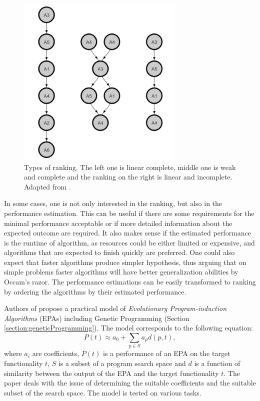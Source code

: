 \begin{figure}
	\includegraphics[width=8cm]{Images/rankingTypes.png}
	\centering
	\caption{Types of ranking. The left one is linear complete, middle one is weak and complete and the ranking on the right is linear and incomplete. Adapted from \cite{BrazdilMetalearning-2009}.}
	\label{fig:rankingTypes}	
\end{figure}

In some cases, one is not only interested in the ranking, but also in the performance estimation. This can be useful if there are some requirements for the minimal performance acceptable or if more detailed information about the expected outcome are required. It also makes sense if the estimated performance is the runtime of algorithm, as resources could be either limited or expensive, and algorithms that are expected to finish quickly are preferred. One could also expect that faster algorithms produce simpler hypothesis, thus arguing that on simple problems faster algorithms will have better generalization abilities by Occam's razor. 
The performance estimations can be easily transformed to ranking by ordering the algorithms by their estimated performance. 

Authors of \cite{evolutionaryProgramPredictingPerformance} propose a practical model of \emph{Evolutionary Program-induction Algorithms} (EPAs) including Genetic Programming (Section \ref{section:geneticProgramming}). The model corresponds to the following equation:
\begin{equation}
P(t) \approx a_0 + \sum_{p \in S}a_pd(p,t),
\end{equation}
where $a_i$ are coefficients, $P(t)$ is a performance of an EPA on the target functionality $t$, $S$ is a subset of a program search space and $d$ is a function of similarity between the output of the EPA and the target functionality $t$. The paper deals with the issue of determining the suitable coefficients and the suitable subset of the search space. The model is tested on various tasks.

